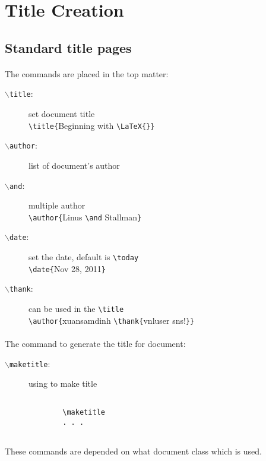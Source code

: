 

\section{Title Creation}
\subsection{Standard title pages}

\paragraph{}
The commands are placed in the top matter:
\begin{description}
	\item[\texttt{$\backslash$title}:] set document title \hfill \\
		\verb|\title{|Beginning with \verb|\LaTeX{}}|
	\item[\texttt{$\backslash$author}:] list of document's author
	\item[\texttt{$\backslash$and}:] multiple author \hfill \\
		\verb|\author{|Linus \verb|\and| Stallman\verb|}|
	\item[\texttt{$\backslash$date}:] set the date, default is \verb|\today| \hfill \\
		\verb|\date{|Nov 28, 2011\verb|}|
	\item[\texttt{$\backslash$thank}:] can be used in the \verb|\title| \hfill \\
		\verb|\author{|xuansamdinh \verb|\thank{|vnluser sns!\verb|}}|
\end{description}

\paragraph{}
The command to generate the title for document:
\begin{description}
	\item[\texttt{$\backslash$maketitle}:] using to make title
		\begin{verbatim}
		
		\maketitle
		. . .
		
		\end{verbatim}
\end{description}
These commands are depended on what document class which is used.

